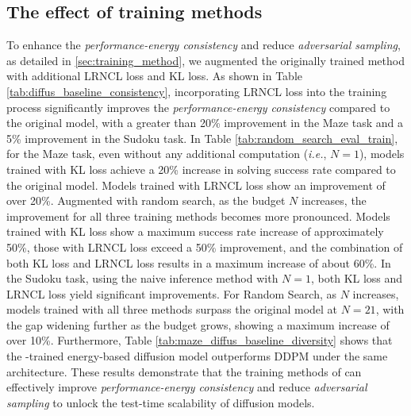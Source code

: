 \subsection{The effect of \proj training methods}
\label{sec:training_improve}
To enhance the \emph{performance-energy consistency} and reduce \emph{adversarial sampling}, as detailed in \ref{sec:training_method}, we augmented the originally trained method with additional LRNCL loss and KL loss. As shown in Table \ref{tab:diffus_baseline_consistency}, incorporating LRNCL loss into the training process significantly improves the \emph{performance-energy consistency} compared to the original model, with a greater than 20\% improvement in the Maze task and a 5\% improvement in the Sudoku task. In Table \ref{tab:random_search_eval_train}, for the Maze task, even without any additional computation (\emph{i.e.}, $N = 1$), models trained with KL loss achieve a 20\% increase in solving success rate compared to the original model. Models trained with LRNCL loss show an improvement of over 20\%. Augmented with random search, as the budget $N$ increases, the improvement for all three training methods becomes more pronounced. Models trained with KL loss show a maximum success rate increase of approximately 50\%, those with LRNCL loss exceed a 50\% improvement, and the combination of both KL loss and LRNCL loss results in a maximum increase of about 60\%. In the Sudoku task, using the naive inference method with $N = 1$, both KL loss and LRNCL loss yield significant improvements. For Random Search, as $N$ increases, models trained with all three \proj methods surpass the original model at $N = 21$, with the gap widening further as the budget grows, showing a maximum increase of over 10\%. Furthermore, Table \ref{tab:maze_diffus_baseline_diversity} shows that the \proj-trained energy-based diffusion model outperforms DDPM \cite{ho2020denoising} under the same architecture. These results demonstrate that the training methods of \proj can effectively improve \emph{performance-energy consistency} and reduce \emph{adversarial sampling} to unlock the test-time scalability of diffusion models.
